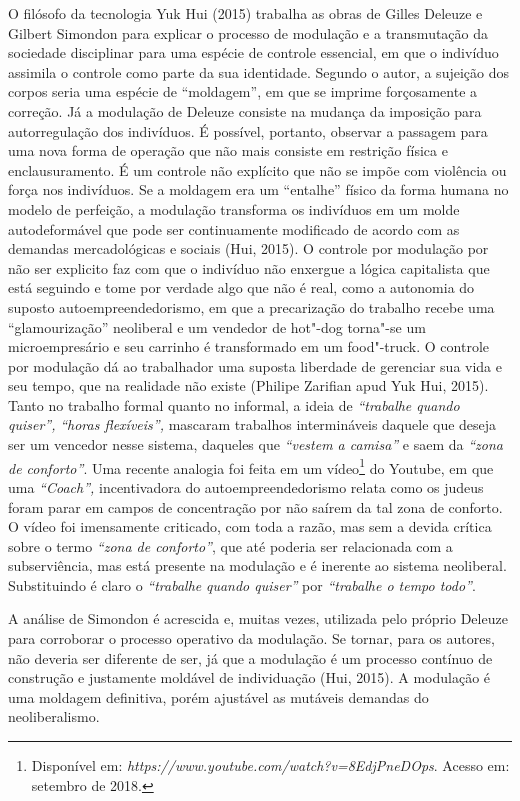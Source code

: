 O filósofo da tecnologia Yuk Hui (2015) trabalha as obras de Gilles
Deleuze e Gilbert Simondon para explicar o processo de modulação e a
transmutação da sociedade disciplinar para uma espécie de controle
essencial, em que o indivíduo assimila o controle como parte da sua
identidade. Segundo o autor, a sujeição dos corpos seria uma espécie de
``moldagem'', em que se imprime forçosamente a correção. Já a modulação
de Deleuze consiste na mudança da imposição para autorregulação dos
indivíduos. É possível, portanto, observar a passagem para uma nova
forma de operação que não mais consiste em restrição física e
enclausuramento. É um controle não explícito que não se impõe com
violência ou força nos indivíduos. Se a moldagem era um ``entalhe''
físico da forma humana no modelo de perfeição, a modulação transforma os
indivíduos em um molde autodeformável que pode ser continuamente
modificado de acordo com as demandas mercadológicas e sociais (Hui,
2015). O controle por modulação por não ser explicito faz com que o
indivíduo não enxergue a lógica capitalista que está seguindo e tome por
verdade algo que não é real, como a autonomia do suposto
autoempreendedorismo, em que a precarização do trabalho recebe uma
``glamourização'' neoliberal e um vendedor de hot"-dog torna"-se um
microempresário e seu carrinho é transformado em um food"-truck. O
controle por modulação dá ao trabalhador uma suposta liberdade de
gerenciar sua vida e seu tempo, que na realidade não existe (Philipe
Zarifian apud Yuk Hui, 2015). Tanto no trabalho formal quanto no
informal, a ideia de \emph{``trabalhe quando quiser'',} \emph{``horas
flexíveis'',} mascaram trabalhos intermináveis daquele que deseja ser um
vencedor nesse sistema, daqueles que \emph{``vestem a camisa''} e saem
da \emph{``zona de conforto''}. Uma recente analogia foi feita em um
vídeo\footnote{Disponível em: \emph{https://www.youtube.com/watch?v=8EdjPneDOps}.
  Acesso em: setembro de 2018.} do Youtube, em que uma \emph{``Coach'',}
incentivadora do autoempreendedorismo relata como os judeus foram parar
em campos de concentração por não saírem da tal zona de conforto. O
vídeo foi imensamente criticado, com toda a razão, mas sem a devida
crítica sobre o termo \emph{``zona de conforto''}, que até poderia ser
relacionada com a subserviência, mas está presente na modulação e é
inerente ao sistema neoliberal. Substituindo é claro o \emph{``trabalhe}
\emph{quando quiser''} por \emph{``trabalhe o tempo todo''}.

A análise de Simondon é acrescida e, muitas vezes, utilizada pelo
próprio Deleuze para corroborar o processo operativo da modulação. Se
tornar, para os autores, não deveria ser diferente de ser, já que a
modulação é um processo contínuo de construção e justamente moldável de
individuação (Hui, 2015). A modulação é uma moldagem definitiva,
porém ajustável as mutáveis demandas do neoliberalismo.

